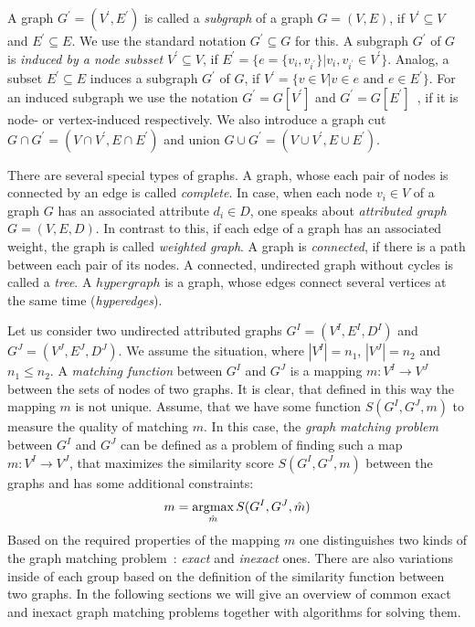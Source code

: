A graph $G^\prime=(V^\prime,E^\prime)$ is called a \emph{subgraph} of a graph $G=(V,E)$, if $V^\prime\subseteq V$ and $E^\prime\subseteq E$. We use the standard notation $G^\prime\subseteq G$ for this. A subgraph $G^\prime$ of $G$ is \emph{induced by a node subsset $V^\prime\subseteq V$}, if $E^\prime=\{e=\{v_i, v_{i^\prime}\}|v_i,v_{i^\prime}\in V^\prime\}$. Analog, a subset $E^\prime\subseteq E$ induces a subgraph $G^\prime$ of $G$, if $V^\prime=\{v\in V|v\in e\text{ and }e\in E^\prime\}$. For an induced subgraph we use the notation $G^\prime=G[V^\prime]$ and $G^\prime=G[E^\prime]$~\cite{Diestel2000}, if it is node- or vertex-induced respectively. We also introduce a graph cut $G\cap G^\prime=(V\cap V^\prime, E\cap E^\prime)$ and union $G\cup G^\prime=(V\cup V^\prime, E\cup E^\prime)$.

There are several special types of graphs. A graph, whose each pair of nodes is connected by an edge is called \emph{complete}. In case, when each node $v_i\in V$ of a graph $G$ has an associated attribute $d_i\in D$, one speaks about \emph{attributed graph} $G=(V,E,D)$. In contrast to this, if each edge of a graph has an associated weight, the graph is called \emph{weighted graph}. A graph is \emph{connected}, if there is a path between each pair of its nodes. A connected, undirected graph without cycles is called a \emph{tree}. A $hypergraph$ is a graph, whose edges connect several vertices at the same time (\emph{hyperedges}).

Let us consider two undirected attributed graphs $G^I = (V^I, E^I, D^I)$ and $G^J = (V^J, E^J,D^J)$. We assume the situation, where $|V^I|=n_1$, $|V^J|=n_2$ and $n_1\le n_2$. A \emph{matching function} between $G^I$ and $G^J$ is a mapping $m:V^I\rightarrow V^J$ between the sets of nodes of two graphs.
It is clear, that defined in this way the mapping $m$ is not unique. Assume, that we have some function $S(G^I, G^J, m)$ to measure the quality of matching $m$. In this case, the \emph{graph matching problem} between $G^I$ and $G^J$ can be defined as a problem of finding such a map $m:V^I\rightarrow V^J$, that maximizes the similarity score $S(G^I, G^J, m)$ between the graphs and has some additional constraints:
\begin{equation} \label{gGMP}
m = \mathop{\rm argmax}_{\hat{m}}S(G^I, G^J, \hat{m})
\end{equation}
Based on the required properties of the mapping $m$ one distinguishes two kinds of the graph matching problem~\cite{Conte2004}: \emph{exact} and \emph{inexact} ones. There are also variations inside of each group based on the definition of the similarity function between two graphs. In the following sections we will give an overview of common exact and inexact graph matching problems together with algorithms for solving them.
